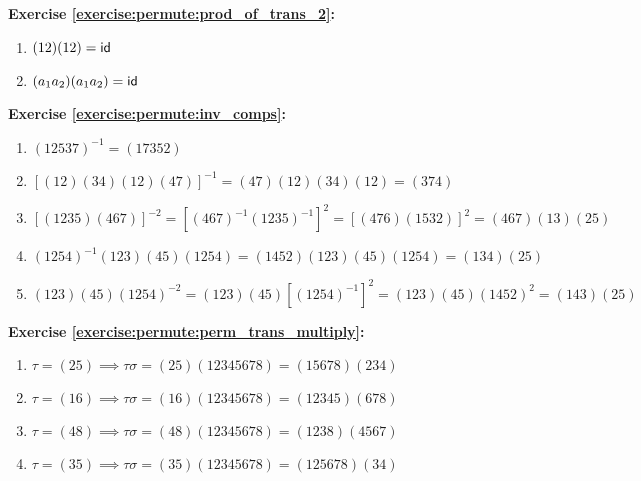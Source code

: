 \noindent\textbf{Exercise \ref{exercise:permute:prod_of_trans_2}:}
\begin{multicols}{2}
\begin{enumerate}[{a.}]
\item
$(12)(12) = \sf{id}$


\item
$(a_1 a_2)(a_1 a_2) = \sf{id}$
\end{enumerate}
\end{multicols}

\noindent\textbf{Exercise \ref{exercise:permute:inv_comps}:}
\begin{enumerate}[{a.}]    
\item
$(12537)^{-1} = (17352)$

\item
$[(12)(34)(12)(47)]^{-1} = (47)(12)(34)(12) = (374)$

\item
$[(1235)(467)]^{-2} = [(467)^{-1}(1235)^{-1}]^2 = [(476)(1532)]^2 = (467)(13)(25)$

\item
$(1254)^{-1}(123)(45)(1254) = (1452)(123)(45)(1254) = (134)(25)$

\item
$(123)(45)(1254)^{-2} = (123)(45)[(1254)^{-1}]^{2} = (123)(45)(1452)^{2} =  (143)(25)$
\end{enumerate}

\noindent\textbf{Exercise \ref{exercise:permute:perm_trans_multiply}:}
\begin{enumerate}[{a.}]
\item
$\tau= (25) \implies \tau\sigma = (25)(12345678) = (15678)(234)$

\item
$\tau= (16) \implies \tau\sigma = (16)(12345678) = (12345)(678)$

\item
$\tau=(48) \implies \tau\sigma = (48)(12345678) = (1238)(4567)$

\item
$\tau=(35) \implies \tau\sigma = (35)(12345678) = (125678)(34)$
\end{enumerate}

